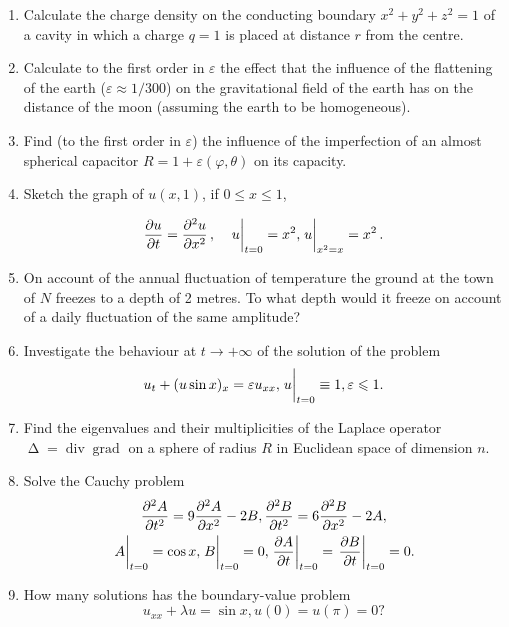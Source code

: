 \documentclass{article}
\DeclareMathOperator{\gradt}{grad}
\DeclareMathOperator{\divt}{div}
\DeclareMathOperator{\Laplace}{\Delta}
\begin{document}
\begin{enumerate}
\item Calculate the charge density on the conducting boundary $x^2 + y^2 + z^2 = 1$ of a cavity in which a charge $q = 1$ is placed at distance $r$ from the centre.

\item Calculate to the first order in $\varepsilon$ the effect that the influence of the flattening of the earth ($\varepsilon \approx 1/300$) on the gravitational field of the earth has on the distance of the moon (assuming the earth to be homogeneous).

\item Find (to the first order in $\varepsilon$) the influence of the imperfection of an almost spherical capacitor $R = 1 + \varepsilon(\varphi, \theta)$ on its capacity.

\item Sketch the graph of $u(x, 1)$, if $0 \leq x \leq 1$,

  \begin{equation*}
    \pdv{u}{t} = \pdv[2]{u}{x}\, , \quad \eval{u}_{t=0} = x^2, \eval{u}_{x^2 = x} = x^2 \, .
  \end{equation*}

\item On account of the annual fluctuation of temperature the ground at the town of $N$ freezes to a depth of 2 metres. To what depth would it freeze on account of a daily fluctuation of the same amplitude?

\item Investigate the behaviour at $t \to + \infty$ of the solution of the problem
  \begin{equation*}
    u_t + (u \sin x)_x = \varepsilon u_{xx}, \eval{u}_{t=0} \equiv 1, \varepsilon \leqslant 1.
  \end{equation*}

\item Find the eigenvalues and their multiplicities of the Laplace operator ${\Laplace = \divt \gradt}$ on a sphere of radius $R$ in Euclidean space of dimension $n$.

\item Solve the Cauchy problem
  \begin{gather*}
    \pdv[2]{A}{t} = 9\pdv[2]{A}{x} - 2B, \pdv[2]{B}{t} = 6 \pdv[2]{B}{x} -2A, \\
    \eval{A}_{t=0} = \cos x, \eval{B}_{t=0} = 0, \eval{\pdv{A}{t}}_{t=0} = \eval{\pdv{B}{t}}_{t=0}=0.
  \end{gather*}

\item How many solutions has the boundary-value problem
  \begin{equation*}
    u_{xx} + \lambda u = \sin x, u(0) = u(\pi) = 0 ?
  \end{equation*}


\end{enumerate}
\end{document}
